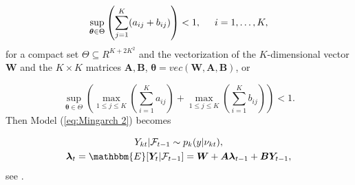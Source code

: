 \begin{equation}
\sup_{\bm{\theta} \in \Theta} \left(\sum_{j=1}^K(a_{ij}+b_{ij})\right) < 1, \hspace{0.5cm} i=1,\ldots,K , 
\label{eq:Mingarch 2 function condition 1}
\end{equation}
%
for a compact set $\Theta \subseteq R^{K+ 2K^2}$ and the vectorization of the $K$-dimensional vector $\bm{W}$ and the $K\times K$ matrices $\bm{A},\bm{B}$, $\bm{\theta}=vec(\bm{W},\bm{A},\bm{B})$, or 

\begin{equation}
\sup_{\bm{\theta} \in \Theta}\left(\max_{1\leq j \leq K}(\sum_{i=1}^K a_{ij}) + \max_{1\leq j \leq K} \left(\sum_{i=1}^K b_{ij}\right)\right) < 1.
\label{eq:Mingarch 2 function condition 2}
\end{equation}
%
Then Model (\ref{eq:Mingarch 2}) becomes 

\begin{equation}
\begin{gathered}
Y_{kt} | \SigA_{t-1} \sim p_k(y|\nu_{kt}), \\
\bm{\lambda}_t = \mathbbm{E}[\bm{Y}_t | \SigA_{t-1}] = \bm{W} + \bm{A}\bm{\lambda}_{t-1} + \bm{B}\bm{Y}_{t-1},
\label{eq:Mingarch 2 linear}
\end{gathered}
\end{equation}
%
see \textcite{Lee:2023}. 
